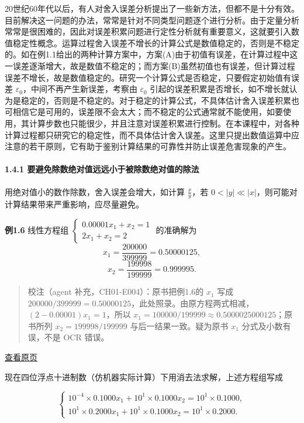 \documentclass[
  10pt,
  fontset=fandol]{ctexart}
\begin{document}
20世纪60年代以后，有人对舍入误差分析提出了一些新方法，但都不是十分有效。目前解决这一问题的办法，常常是针对不同类型问题逐个进行分析。由于定量分析常常是很困难的，因此对误差积累问题进行定性分析就有重要意义，这就要引入数值稳定性概念。运算过程舍入误差不增长的计算公式是数值稳定的，否则是不稳定的。如在例1.1给出的两种计算方案中，方案(A)由于初值有误差，在计算过程中这一误差逐渐增大，故是数值不稳定的；而方案(B)虽然初值也有误差，但计算过程误差不增长，故是数值稳定的。研究一个计算公式是否稳定，只要假定初始值有误差 \(\varepsilon_0\)，中间不再产生新误差，考察由 \(\varepsilon_0\) 引起的误差积累是否增长，如不增长就认为是稳定的，否则是不稳定的。对于稳定的计算公式，不具体估计舍入误差积累也可相信它是可用的，误差限不会太大；而不稳定的公式通常就不能使用，如要使用，其计算步数也只能很少，并且注意对误差积累进行控制。在本课程中，对各种计算过程都只研究它的稳定性，而不具体估计舍入误差。这里只提出数值运算中应注意的若干原则，它有助于鉴别计算结果的可靠性并防止误差危害现象的产生。

\paragraph{1.4.1 要避免除数绝对值远远小于被除数绝对值的除法}\label{ux8981ux907fux514dux9664ux6570ux7eddux5bf9ux503cux8fdcux8fdcux5c0fux4e8eux88abux9664ux6570ux7eddux5bf9ux503cux7684ux9664ux6cd5}

用绝对值小的数作除数，舍入误差会增大，如计算 \(\frac{x}{y}\)，若 \(0 < |y| \ll |x|\)，则可能对计算结果带来严重影响，应尽量避免。

\textbf{例1.6} 线性方程组 \(\begin{cases} 0.00001x_1 + x_2 = 1 \\ 2x_1 + x_2 = 2 \end{cases}\) 的准确解为 \[
x_1 = \frac{200000}{399999} = 0.50000125,
\] \[
x_2 = \frac{199998}{199999} = 0.999995.
\]

\begin{quote}
校注（agent 补充，CH01-E004）：原书把例1.6的 \(x_1\) 写成 \(200000/399999=0.50000125\)，此处照录。由原方程两式相减，\((2-0.00001)x_1=1\)，所以 \(x_1=100000/199999\approx0.5000025000125\)；原书所列 \(x_2=199998/199999\) 与后一结果一致。疑为原书 \(x_1\) 分式及小数有误，不是 OCR 错误。
\end{quote}

\href{../../source-images/pdf-023.jpeg}{查看原页}

现在四位浮点十进制数（仿机器实际计算）下用消去法求解，上述方程组写成

\[
\begin{cases} 10^{-4} \times 0.1000x_1 + 10^1 \times 0.1000x_2 = 10^1 \times 0.1000, \\ 10^1 \times 0.2000x_1 + 10^1 \times 0.1000x_2 = 10^1 \times 0.2000. \end{cases}
\]
\end{document}
